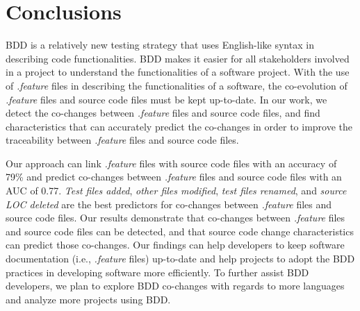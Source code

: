 \section{Conclusions}
BDD is a relatively new testing strategy that uses English-like syntax in describing code functionalities. BDD makes it easier for all stakeholders involved in a project to understand the functionalities of a software project. With the use of \textit{.feature} files in describing the functionalities of a software, the co-evolution of \textit{.feature} files and source code files must be kept up-to-date. In our work, we detect the co-changes between \textit{.feature} files and source code files, and find characteristics that can accurately predict the co-changes in order to improve the traceability between \textit{.feature} files and source code files.

Our approach can link \textit{.feature} files with source code files with an accuracy of 79\% and predict co-changes between \textit{.feature} files and source code files with an AUC of 0.77. \textit{Test files added}, \textit{other files modified}, \textit{test files renamed}, and \textit{source LOC deleted} are the best predictors for co-changes between \textit{.feature} files and source code files. Our results demonstrate that co-changes between \textit{.feature} files and source code files can be detected, and that source code change characteristics can predict those co-changes. Our findings can help developers to keep software documentation (i.e., \textit{.feature} files) up-to-date and help projects to adopt the BDD practices in developing software more efficiently. To further assist BDD developers, we plan to explore BDD co-changes with regards to more languages and analyze more projects using BDD.

